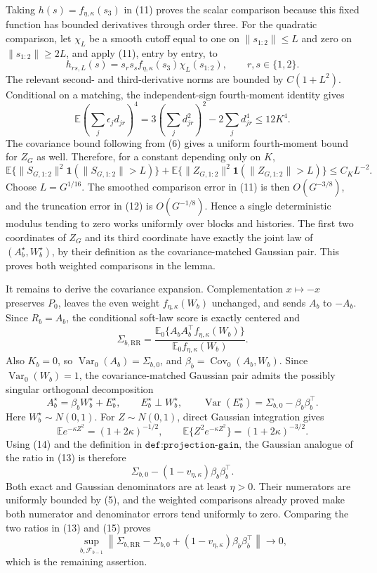 Taking \(h(s)=f_{\eta,\kappa}(s_3)\) in (11) proves the scalar comparison because this fixed function has bounded derivatives through order three.  For the quadratic comparison, let \(\chi_L\) be a smooth cutoff equal to one on \(\|s_{1:2}\|\leq L\) and zero on \(\|s_{1:2}\|\geq2L\), and apply (11), entry by entry, to
\[
h_{rs,L}(s)=s_rs_s f_{\eta,\kappa}(s_3)\chi_L(s_{1:2}),
\qquad r,s\in\{1,2\}.
\]
The relevant second- and third-derivative norms are bounded by \(C(1+L^2)\).  Conditional on a matching, the independent-sign fourth-moment identity gives
\[
\mathbb E\left(\sum_j\epsilon_jd_{jr}\right)^4
=3\left(\sum_jd_{jr}^2\right)^2-2\sum_jd_{jr}^4
\leq12K^4.
\]
The covariance bound following from (6) gives a uniform fourth-moment bound for \(Z_G\) as well.  Therefore, for a constant depending only on \(K\),
\[
\mathbb E\{\|S_{G,1:2}\|^2\mathbf1(\|S_{G,1:2}\|>L)\}
+\mathbb E\{\|Z_{G,1:2}\|^2\mathbf1(\|Z_{G,1:2}\|>L)\}
\leq C_KL^{-2}.                                           \tag{12}
\]
Choose \(L=G^{1/16}\).  The smoothed comparison error in (11) is then \(O(G^{-3/8})\), and the truncation error in (12) is \(O(G^{-1/8})\).  Hence a single deterministic modulus tending to zero works uniformly over blocks and histories.  The first two coordinates of \(Z_G\) and its third coordinate have exactly the joint law of \((A_b^\star,W_b^\star)\), by their definition as the covariance-matched Gaussian pair.  This proves both weighted comparisons in the lemma.

It remains to derive the covariance expansion.  Complementation \(x\mapsto-x\) preserves \(P_0\), leaves the even weight \(f_{\eta,\kappa}(W_b)\) unchanged, and sends \(A_b\) to \(-A_b\).  Since \(R_b=A_b\), the conditional soft-law score is exactly centered and
\[
\Sigma_{b,\mathrm{RR}}
=\frac{\mathbb E_0\{A_bA_b^\top f_{\eta,\kappa}(W_b)\}}
       {\mathbb E_0f_{\eta,\kappa}(W_b)}.                \tag{13}
\]
Also \(K_b=0\), so \(\operatorname{Var}_0(A_b)=\Sigma_{b,0}\), and \(\beta_b=\operatorname{Cov}_0(A_b,W_b)\).  Since \(\operatorname{Var}_0(W_b)=1\), the covariance-matched Gaussian pair admits the possibly singular orthogonal decomposition
\[
A_b^\star=\beta_bW_b^\star+E_b^\star,
\qquad
E_b^\star\perp W_b^\star,
\qquad
\operatorname{Var}(E_b^\star)=\Sigma_{b,0}-\beta_b\beta_b^\top. \tag{14}
\]
Here \(W_b^\star\sim N(0,1)\).  For \(Z\sim N(0,1)\), direct Gaussian integration gives
\[
\mathbb Ee^{-\kappa Z^2}=(1+2\kappa)^{-1/2},
\qquad
\mathbb E\{Z^2e^{-\kappa Z^2}\}=(1+2\kappa)^{-3/2}.
\]
Using (14) and the definition in \(\texttt{def:projection-gain}\), the Gaussian analogue of the ratio in (13) is therefore
\[
\Sigma_{b,0}-(1-v_{\eta,\kappa})\beta_b\beta_b^\top.     \tag{15}
\]
Both exact and Gaussian denominators are at least \(\eta>0\).  Their numerators are uniformly bounded by (5), and the weighted comparisons already proved make both numerator and denominator errors tend uniformly to zero.  Comparing the two ratios in (13) and (15) proves
\[
\sup_{b,\mathcal F_{b-1}}
\left\|\Sigma_{b,\mathrm{RR}}-\Sigma_{b,0}
 +(1-v_{\eta,\kappa})\beta_b\beta_b^\top\right\|\longrightarrow0,
\]
which is the remaining assertion.